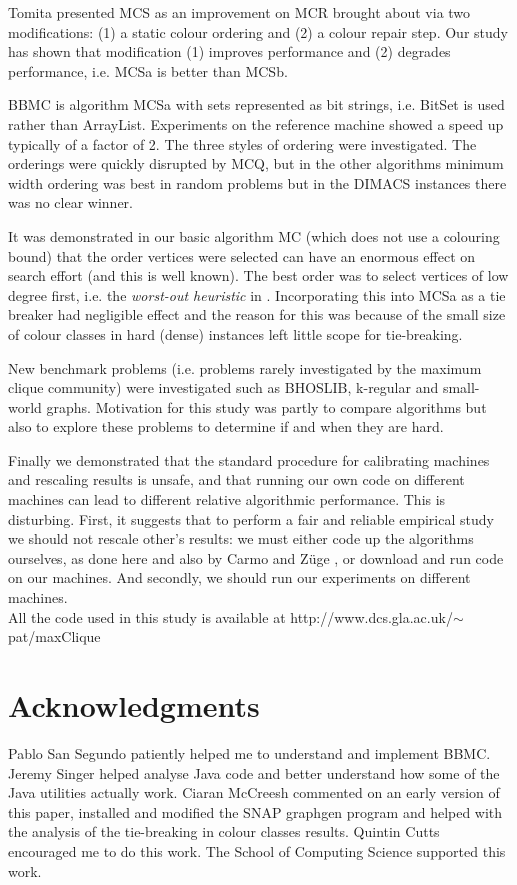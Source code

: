 \documentclass{l4proj}
\begin{document}
Tomita \cite{tomita2010} presented MCS as an improvement on MCR brought about via two modifications: (1) a static
colour ordering and (2) a colour repair step. Our study has shown that modification (1) improves performance
and (2) degrades performance, i.e. MCSa is better than MCSb. 

BBMC is algorithm MCSa with sets represented as bit strings, i.e. BitSet is used rather than ArrayList. Experiments
on the reference machine showed a speed up typically of a factor of 2. The three styles of ordering were investigated. 
The orderings were quickly disrupted by MCQ, but in the other algorithms minimum width ordering was best 
in random problems but in the DIMACS instances there was no clear winner. 

It was demonstrated in our basic algorithm MC (which does not use a colouring bound) that the order vertices were
selected can have an enormous effect on search effort (and this is well known). The best order was to select vertices of low degree first, 
i.e. the \emph{worst-out heuristic} in \cite{maxClique}. Incorporating this into MCSa as a tie breaker had negligible 
effect and the reason for this was because of the small size of colour classes in hard (dense) instances left 
little scope for tie-breaking.

New benchmark problems (i.e. problems rarely investigated by the maximum clique community) were investigated such as
BHOSLIB, k-regular and small-world graphs. Motivation for this study was partly to compare algorithms but also to
explore these problems to determine if and when they are hard.

Finally we demonstrated that the standard procedure for calibrating machines and rescaling results is unsafe, and that
running our own code on different machines can lead to different relative algorithmic performance. This is disturbing.
First, it suggests that to perform a fair and reliable empirical study we should not rescale other's results: we must either code
up the algorithms ourselves, as done here and also by Carmo and Z{\"u}ge \cite{carmoZuge},  or download and run code on our machines. And
secondly, we should run our experiments on different machines.\\

\noindent
All the code used in this study is available at http://www.dcs.gla.ac.uk/$\sim$pat/maxClique

\section*{Acknowledgments}
Pablo San Segundo patiently helped me to understand and implement BBMC. Jeremy Singer helped analyse Java code
and better understand how some of the Java utilities actually work. Ciaran McCreesh commented on an early version of this paper, 
installed and modified the SNAP graphgen program and helped with the analysis of the tie-breaking in colour classes results.
Quintin Cutts encouraged me to do this work. The School of Computing Science supported this work.
\end{document}
